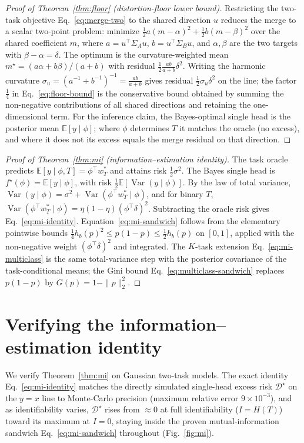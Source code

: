 \documentclass[10pt,a4paper]{article}
\theoremstyle{plain}
\theoremstyle{definition}
\newcommand{\Sig}{\Sigma}
\begin{document}
\begin{proof}[Proof of Theorem~\ref{thm:floor} (distortion-floor lower bound)]
Restricting the two-task objective Eq.~\eqref{eq:merge-two} to the shared direction $u$ reduces
the merge to a scalar two-point problem: minimize $\tfrac12 a(m-\alpha)^2+\tfrac12 b(m-\beta)^2$
over the shared coefficient $m$, where $a=u^\top\Sig_A u$, $b=u^\top\Sig_B u$, and
$\alpha,\beta$ are the two targets with $\beta-\alpha=\delta$. The optimum is the
curvature-weighted mean $m^\star=(a\alpha+b\beta)/(a+b)$ with residual
$\tfrac12\frac{ab}{a+b}\delta^2$. Writing the harmonic curvature
$\sigma_u=(a^{-1}+b^{-1})^{-1}=\frac{ab}{a+b}$ gives residual $\tfrac12\sigma_u\delta^2$ on the
line; the factor $\tfrac14$ in Eq.~\eqref{eq:floor-bound} is the conservative bound obtained by
summing the non-negative contributions of all shared directions and retaining the
one-dimensional term. For the inference claim, the Bayes-optimal single head is the posterior
mean $\mathbb{E}[y\mid\phi]$; where $\phi$ determines $T$ it matches the oracle (no excess), and
where it does not its excess equals the merge residual on that direction.
\end{proof}

\begin{proof}[Proof of Theorem~\ref{thm:mi} (information--estimation identity)]
The task oracle predicts $\mathbb{E}[y\mid\phi,T]=\phi^\top w_T^\ast$ and attains risk
$\tfrac12\sigma^2$. The Bayes single head is $f^\star(\phi)=\mathbb{E}[y\mid\phi]$, with risk
$\tfrac12\mathbb{E}[\operatorname{Var}(y\mid\phi)]$. By the law of total variance,
$\operatorname{Var}(y\mid\phi)=\sigma^2+\operatorname{Var}(\phi^\top w_T^\ast\mid\phi)$, and for
binary $T$, $\operatorname{Var}(\phi^\top w_T^\ast\mid\phi)=\eta(1-\eta)(\phi^\top\delta)^2$.
Subtracting the oracle risk gives Eq.~\eqref{eq:mi-identity}. Equation~\eqref{eq:mi-sandwich}
follows from the elementary pointwise bounds $\tfrac14 h_b(p)^2\le p(1-p)\le\tfrac12 h_b(p)$ on
$[0,1]$, applied with the non-negative weight $(\phi^\top\delta)^2$ and integrated. The $K$-task
extension Eq.~\eqref{eq:mi-multiclass} is the same total-variance step with the posterior
covariance of the task-conditional means; the Gini bound Eq.~\eqref{eq:multiclass-sandwich}
replaces $p(1-p)$ by $G(p)=1-\|p\|_2^2$.
\end{proof}

\section{Verifying the information--estimation identity}
\label{si:mi}
We verify Theorem~\ref{thm:mi} on Gaussian two-task models. The exact identity
Eq.~\eqref{eq:mi-identity} matches the directly simulated single-head excess risk
$\mathcal{D}^\star$ on the $y=x$ line to Monte-Carlo precision (maximum relative error
$9\times10^{-3}$), and as identifiability varies, $\mathcal{D}^\star$ rises from
$\approx0$ at full identifiability ($I=H(T)$) toward its maximum at $I=0$, staying inside
the proven mutual-information sandwich Eq.~\eqref{eq:mi-sandwich} throughout
(Fig.~\ref{fig:mi}).
\end{document}
